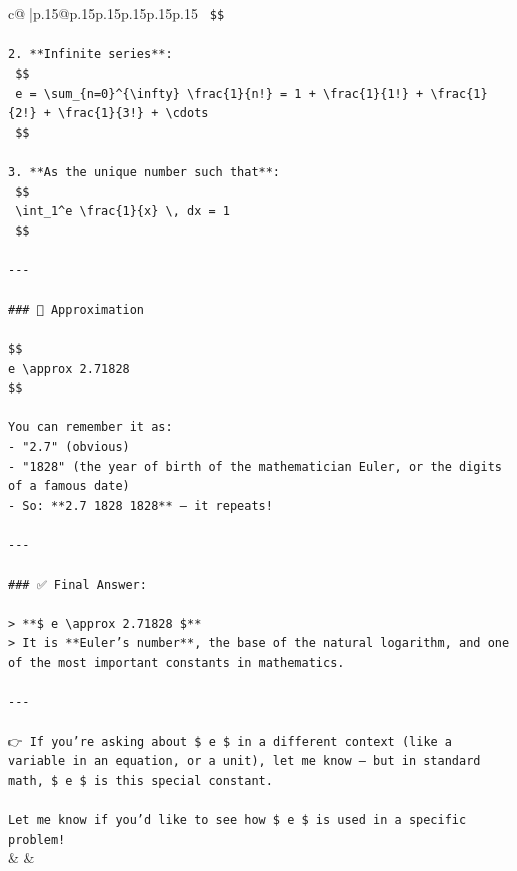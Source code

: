\documentclass{article}
\begin{document}
{\begin{supertabular}{c@{$\;$}|p{.15\linewidth}@{}p{.15\linewidth}p{.15\linewidth}p{.15\linewidth}p{.15\linewidth}p{.15\linewidth}}
{{{\texttt{   \$\$} \\
\\ 
\texttt{2. **Infinite series**:} \\
\texttt{   \$\$} \\
\texttt{   e = \textbackslash{}sum\_\{n=0\}\^{}\{\textbackslash{}infty\} \textbackslash{}frac\{1\}\{n!\} = 1 + \textbackslash{}frac\{1\}\{1!\} + \textbackslash{}frac\{1\}\{2!\} + \textbackslash{}frac\{1\}\{3!\} + \textbackslash{}cdots} \\
\texttt{   \$\$} \\
\\ 
\texttt{3. **As the unique number such that**:} \\
\texttt{   \$\$} \\
\texttt{   \textbackslash{}int\_1\^{}e \textbackslash{}frac\{1\}\{x\} \textbackslash{}, dx = 1} \\
\texttt{   \$\$} \\
\\ 
\texttt{{-}{-}{-}} \\
\\ 
\texttt{\#\#\# 🔹 Approximation} \\
\\ 
\texttt{\$\$} \\
\texttt{e \textbackslash{}approx 2.71828} \\
\texttt{\$\$} \\
\\ 
\texttt{You can remember it as:} \\
\texttt{{-} "2.7" (obvious)} \\
\texttt{{-} "1828" (the year of birth of the mathematician Euler, or the digits of a famous date)} \\
\texttt{{-} So: **2.7 1828 1828** — it repeats!} \\
\\ 
\texttt{{-}{-}{-}} \\
\\ 
\texttt{\#\#\# ✅ Final Answer:} \\
\\ 
\texttt{> **\$ e \textbackslash{}approx 2.71828 \$**  } \\
\texttt{> It is **Euler's number**, the base of the natural logarithm, and one of the most important constants in mathematics.} \\
\\ 
\texttt{{-}{-}{-}} \\
\\ 
\texttt{👉 If you're asking about \$ e \$ in a different context (like a variable in an equation, or a unit), let me know — but in standard math, \$ e \$ is this special constant.} \\
\\ 
\texttt{Let me know if you'd like to see how \$ e \$ is used in a specific problem!} \\
            }
        }
    }
    & & \\ \\


\end{supertabular}}
\end{document}
